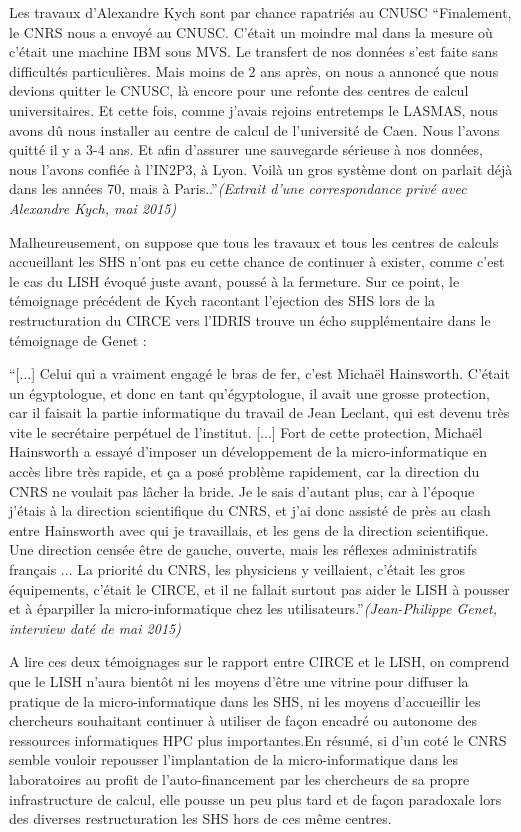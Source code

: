 Les travaux d'Alexandre Kych sont par chance rapatriés au CNUSC \enquote{Finalement, le CNRS nous a envoyé au CNUSC. C'était un moindre mal dans la mesure où c'était une machine IBM sous MVS. Le transfert de nos données s'est faite sans difficultés particulières. Mais moins de 2 ans après, on nous a annoncé que nous devions quitter le CNUSC, là encore pour une refonte des centres de calcul universitaires. Et cette fois, comme j'avais rejoins entretemps le LASMAS, nous avons dû nous installer au centre de calcul de l'université de Caen. Nous l'avons quitté il y a 3-4 ans. Et afin d'assurer une sauvegarde sérieuse à nos données, nous l'avons confiée à l'IN2P3, à Lyon. Voilà un gros système dont on parlait déjà dans les années 70, mais à Paris..}\textit{(Extrait d'une correspondance privé avec Alexandre Kych, mai 2015)}

Malheureusement, on suppose que tous les travaux et tous les centres de calculs accueillant les SHS n'ont pas eu cette chance de continuer à exister, comme c'est le cas du LISH évoqué juste avant, poussé à la fermeture. Sur ce point, le témoignage précédent de Kych racontant l'ejection des SHS lors de la restructuration du CIRCE vers l'IDRIS trouve un écho supplémentaire dans le témoignage de Genet :

\enquote{[...] Celui qui a vraiment engagé le bras de fer, c'est Michaël Hainsworth. C'était un égyptologue, et donc en tant qu'égyptologue, il avait une grosse protection, car il faisait la partie informatique du travail de Jean Leclant, qui est devenu très vite le secrétaire perpétuel de l'institut. [...] Fort de cette protection, Michaël Hainsworth a essayé d'imposer un développement de la micro-informatique en accès libre très rapide, et ça a posé problème rapidement, car la direction du CNRS ne voulait pas lâcher la bride. Je le sais d'autant plus, car à l'époque j'étais à la direction scientifique du CNRS, et j'ai donc assisté de près au clash entre Hainsworth avec qui je travaillais, et les gens de la direction scientifique. Une direction censée être de gauche, ouverte, mais les réflexes administratifs français ... La priorité du CNRS, les physiciens y veillaient, c'était les gros équipements, c'était le CIRCE, et il ne fallait surtout pas aider le LISH à pousser et à éparpiller la micro-informatique chez les utilisateurs.}\textit{(Jean-Philippe Genet, interview daté de mai 2015)}

A lire ces deux témoignages sur le rapport entre CIRCE et le LISH, on comprend que le LISH n'aura bientôt ni les moyens d'être une vitrine pour diffuser la pratique de la micro-informatique dans les SHS, ni les moyens d'accueillir les chercheurs souhaitant continuer à utiliser de façon encadré ou autonome des ressources informatiques HPC plus importantes.En résumé, si d'un coté le CNRS semble vouloir repousser l'implantation de la micro-informatique dans les laboratoires au profit de l'auto-financement par les chercheurs de sa propre infrastructure de calcul, elle pousse un peu plus tard et de façon paradoxale lors des diverses restructuration les SHS hors de ces même centres.

